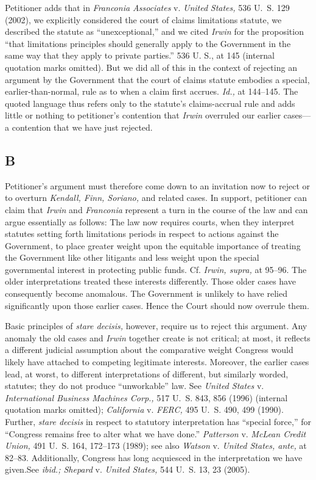   Petitioner adds that in \emph{Franconia Associates} v. \emph{United} \emph{States,} 536 U.~S. 129 (2002), we explicitly considered the court of claims limitations statute, we described the statute as ``unexceptional,'' and we cited \emph{Irwin} for the proposition ``that limitations principles should generally apply to the Government in the same way that they apply to private parties.'' 536 U. S., at 145 (internal quotation marks omitted). But we did all of this in the context of rejecting an argument by the Government that the court of claims statute embodies a special, earlier-than-normal, rule as to when a claim first accrues. \emph{Id.,} at 144--145. The quoted language thus refers only to the statute's claims-accrual rule and adds little or nothing to petitioner's contention that \emph{Irwin} overruled our earlier cases---a contention that we have just rejected.

\subsection{B}

  Petitioner's argument must therefore come down to an invitation now to reject or to overturn \emph{Kendall, Finn, Soriano,} and related cases. In support, petitioner can claim that \emph{Irwin} and \emph{Franconia} represent a turn in the course of the law and can argue essentially as follows: The law now requires courts, when they interpret statutes setting forth limitations periods in respect to actions against the Government, to place greater weight upon the equitable importance of treating the Government like other litigants and less weight upon the special governmental interest in protecting public funds. Cf. \emph{Irwin, supra,} at 95--96. The older interpretations treated these interests differently. Those older cases have consequently become anomalous. The Government is unlikely to have relied significantly upon those earlier cases. Hence the Court should now overrule them.

  \newpage Basic principles of \emph{stare decisis,} however, require us to reject this argument. Any anomaly the old cases and \emph{Irwin} together create is not critical; at most, it reflects a different judicial assumption about the comparative weight Congress would likely have attached to competing legitimate interests. Moreover, the earlier cases lead, at worst, to different interpretations of different, but similarly worded, statutes; they do not produce ``unworkable'' law. See \emph{United States} v. \emph{International Business Machines Corp.,} 517 U.~S. 843, 856 (1996) (internal quotation marks omitted); \emph{California} v. \emph{FERC,} 495 U.~S. 490, 499 (1990). Further, \emph{stare decisis} in respect to statutory interpretation has ``special force,'' for ``Congress remains free to alter what we have done.'' \emph{Patterson} v. \emph{McLean Credit Union,} 491 U.~S. 164, 172--173 (1989); see also \emph{Watson} v. \emph{United States, ante,} at 82--83. Additionally, Congress has long acquiesced in the interpretation we have given.See \emph{ibid.; Shepard} v. \emph{United States,} 544 U.~S. 13, 23 (2005).

